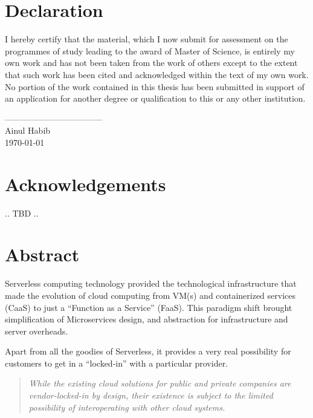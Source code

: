 \documentclass{article}
\begin{document}
\section*{Declaration}
\begin{flushleft}
I hereby certify that the material, which I now submit for assessment on the programmes of study leading to the award of Master of Science, is entirely my own work and has not been taken from the work of others except to the extent that such work has been cited and acknowledged within the text of my own work. No portion of the work contained in this thesis has been submitted in support of an application for another degree or qualification to this or any other institution.
\end{flushleft}
\vspace{2cm}
\begin{flushright}
-----------------------------------\\
Ainul Habib\\
\today
\end{flushright}
\pagebreak

\section*{Acknowledgements}
 .. TBD ..
\pagebreak

\listoffigures
\pagebreak
 
\listoftables
\pagebreak


\tableofcontents
\pagebreak

\section*{Abstract}

Serverless computing technology provided the technological infrastructure that made the evolution of cloud computing from VM(s) and containerized services (CaaS) to just a “Function as a Service” (FaaS). This paradigm shift brought simplification of Microservices design, and abstraction for infrastructure and server overheads.

Apart from all the goodies of Serverless, it provides a very real possibility for customers to get in a “locked-in” with a particular provider. 

\begin{quote}
    \textit{While the existing cloud solutions for public and private companies are vendor-locked-in by design, their existence is subject to the limited possibility of interoperating with other cloud systems.}\\
    \cite{Opara-Martins-2014} 
\end{quote}
\end{document}
